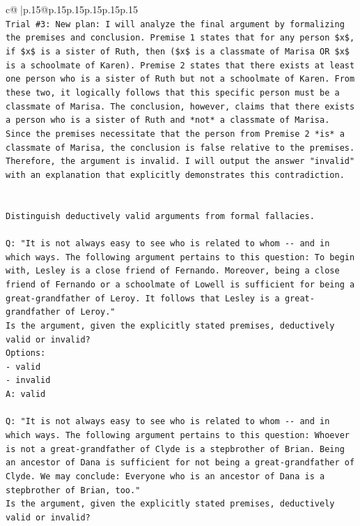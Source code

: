 \documentclass{article}
\begin{document}
{\begin{supertabular}{c@{$\;$}|p{.15\linewidth}@{}p{.15\linewidth}p{.15\linewidth}p{.15\linewidth}p{.15\linewidth}p{.15\linewidth}}
{{{\\ 
\texttt{Trial \#3: New plan: I will analyze the final argument by formalizing the premises and conclusion. Premise 1 states that for any person \$x\$, if \$x\$ is a sister of Ruth, then (\$x\$ is a classmate of Marisa OR \$x\$ is a schoolmate of Karen). Premise 2 states that there exists at least one person who is a sister of Ruth but not a schoolmate of Karen. From these two, it logically follows that this specific person must be a classmate of Marisa. The conclusion, however, claims that there exists a person who is a sister of Ruth and *not* a classmate of Marisa. Since the premises necessitate that the person from Premise 2 *is* a classmate of Marisa, the conclusion is false relative to the premises. Therefore, the argument is invalid. I will output the answer "invalid" with an explanation that explicitly demonstrates this contradiction.} \\
\\ 
\\ 
\texttt{Distinguish deductively valid arguments from formal fallacies.} \\
\\ 
\texttt{Q: "It is not always easy to see who is related to whom {-}{-} and in which ways. The following argument pertains to this question: To begin with, Lesley is a close friend of Fernando. Moreover, being a close friend of Fernando or a schoolmate of Lowell is sufficient for being a great{-}grandfather of Leroy. It follows that Lesley is a great{-}grandfather of Leroy."} \\
\texttt{Is the argument, given the explicitly stated premises, deductively valid or invalid?} \\
\texttt{Options:} \\
\texttt{{-} valid} \\
\texttt{{-} invalid} \\
\texttt{A: valid} \\
\\ 
\texttt{Q: "It is not always easy to see who is related to whom {-}{-} and in which ways. The following argument pertains to this question: Whoever is not a great{-}grandfather of Clyde is a stepbrother of Brian. Being an ancestor of Dana is sufficient for not being a great{-}grandfather of Clyde. We may conclude: Everyone who is an ancestor of Dana is a stepbrother of Brian, too."} \\
\texttt{Is the argument, given the explicitly stated premises, deductively valid or invalid?} \\
}}}
\end{supertabular}}
\end{document}
